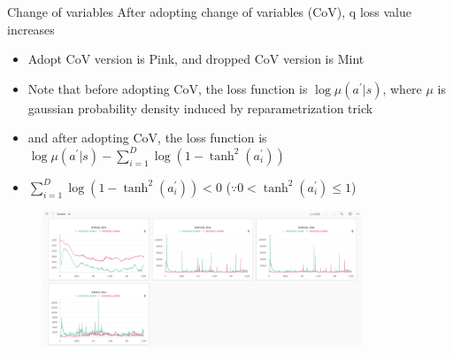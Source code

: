 \documentclass[8pt]{beamer}
\begin{document}
\begin{frame}{Change of variables}
    After adopting change of variables (CoV), q loss value increases

    \begin{itemize}
        \item Adopt CoV version is Pink, and dropped CoV version is Mint
        \item Note that before adopting CoV, the loss function is $\operatorname{log} \mu(a^\prime |s)$, where $\mu$ is gaussian probability density induced by reparametrization trick
        \item and after adopting CoV, the loss function is $\operatorname{log} \mu(a^\prime |s) - \sum_{i=1}^D \log{(1 - \operatorname{tanh}^2 (a^\prime_i))}$
        \item $ \sum_{i=1}^D \log{(1 - \operatorname{tanh}^2 (a^\prime_i))} < 0$ ($\because 0 < \operatorname{tanh}^2 (a^\prime_i) \leq 1$)
    
    \end{itemize}
    \begin{figure}
        \includegraphics[width=0.85\textwidth]{AfterCoVPLossDiff.png}
    \end{figure}
\end{frame}
\end{document}
